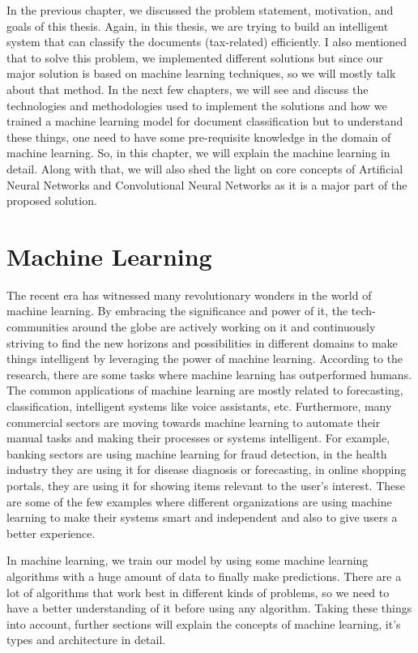 In the previous chapter, we discussed the problem statement, motivation, and goals of this thesis. Again, in this thesis, we are trying to build an intelligent system that can classify the documents (tax-related) efficiently. I also mentioned that to solve this problem, we implemented different solutions but since our major solution is based on machine learning techniques, so we will mostly talk about that method. In the next few chapters, we will see and discuss the technologies and methodologies used to implement the solutions and how we trained a machine learning model for document classification but to understand these things, one need to have some pre-requisite knowledge in the domain of machine learning. So, in this chapter, we will explain the machine learning in detail. Along with that, we will also shed the light on core concepts of Artificial Neural Networks and Convolutional Neural Networks as it is a major part of the proposed solution.

\section{Machine Learning}
The recent era has witnessed many revolutionary wonders in the world of machine learning. By embracing the significance and power of it, the tech-communities around the globe are actively working on it and continuously striving to find the new horizons and possibilities in different domains to make things intelligent by leveraging the power of machine learning. According to the research, there are some tasks where machine learning has outperformed humans. The common applications of machine learning are mostly related to forecasting, classification, intelligent systems like voice assistants, etc. Furthermore, many commercial sectors are moving towards machine learning to automate their manual tasks and making their processes or systems intelligent. For example, banking sectors are using machine learning for fraud detection, in the health industry they are using it for disease diagnosis or forecasting, in online shopping portals, they are using it for showing items relevant to the user's interest. These are some of the few examples where different organizations are using machine learning to make their systems smart and independent and also to give users a better experience. 

\par
In machine learning, we train our model by using some machine learning algorithms with a huge amount of data to finally make predictions. There are a lot of algorithms that work best in different kinds of problems, so we need to have a better understanding of it before using any algorithm. Taking these things into account, further sections will explain the concepts of machine learning, it's types and architecture in detail.

